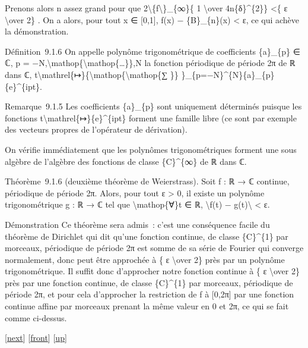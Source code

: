 \documentclass[]{article}
\begin{document}
Prenons alors n assez grand pour que
2\textbackslash{}\textbar{}\{f\textbackslash{}\textbar{}\}\_\{∞\}\{ 1
\textbackslash{}over 4n\{δ\}\^{}\{2\}\} \textless{}\{ ε
\textbackslash{}over 2\} . On a alors, pour tout x ∈ {[}0,1{]},
\textbar{}f(x) − \{B\}\_\{n\}(x)\textbar{} \textless{} ε, ce qui achève
la démonstration.

Définition~9.1.6 On appelle polynôme trigonométrique de coefficients
\{a\}\_\{p\} ∈ ℂ, p =
−N,\textbackslash{}mathop\{\textbackslash{}mathop\{\ldots{}\}\},N la
fonction périodique de période 2π de ℝ dans ℂ,
t\textbackslash{}mathrel\{↦\}\{\textbackslash{}mathop\{\textbackslash{}mathop\{∑
\}\} \}\_\{p=−N\}\^{}\{N\}\{a\}\_\{p\}\{e\}\^{}\{ipt\}.

Remarque~9.1.5 Les coefficients \{a\}\_\{p\} sont uniquement déterminés
puisque les fonctions t\textbackslash{}mathrel\{↦\}\{e\}\^{}\{ipt\}
forment une famille libre (ce sont par exemple des vecteurs propres de
l'opérateur de dérivation).

On vérifie immédiatement que les polynômes trigonométriques forment une
sous algèbre de l'algèbre des fonctions de classe \{C\}\^{}\{∞\} de ℝ
dans ℂ.

Théorème~9.1.6 (deuxième théorème de Weierstrass). Soit f : ℝ → ℂ
continue, périodique de période 2π. Alors, pour tout ε \textgreater{} 0,
il existe un polynôme trigonométrique g : ℝ → ℂ tel que
\textbackslash{}mathop\{∀\}t ∈ ℝ, \textbackslash{}\textbar{}f(t) −
g(t)\textbackslash{}\textbar{} \textless{} ε.

Démonstration Ce théorème sera admis~: c'est une conséquence facile du
théorème de Dirichlet qui dit qu'une fonction continue, de classe
\{C\}\^{}\{1\} par morceaux, périodique de période 2π est somme de sa
série de Fourier qui converge normalement, donc peut être approchée à \{
ε \textbackslash{}over 2\} près par un polynôme trigonométrique. Il
suffit donc d'approcher notre fonction continue à \{ ε
\textbackslash{}over 2\} près par une fonction continue, de classe
\{C\}\^{}\{1\} par morceaux, périodique de période 2π, et pour cela
d'approcher la restriction de f à {[}0,2π{]} par une fonction continue
affine par morceaux prenant la même valeur en 0 et 2π, ce qui se fait
comme ci-dessus.

{[}\href{coursse51.html}{next}{]} {[}\href{coursse50.html}{front}{]}
{[}\href{coursch10.html\#coursse50.html}{up}{]}
\end{document}
